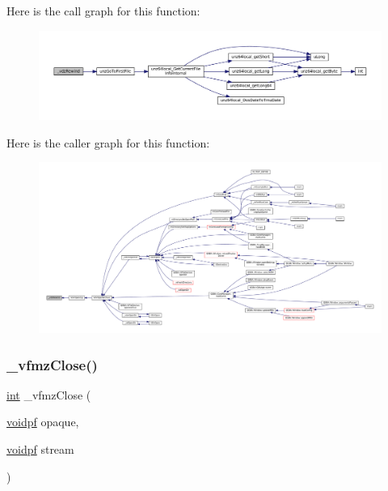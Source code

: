 Here is the call graph for this function\+:
\nopagebreak
\begin{figure}[H]
\begin{center}
\leavevmode
\includegraphics[width=350pt]{vfs-zip_8c_a01992145dbe331dad189be7ade324a00_cgraph}
\end{center}
\end{figure}
Here is the caller graph for this function\+:
\nopagebreak
\begin{figure}[H]
\begin{center}
\leavevmode
\includegraphics[width=350pt]{vfs-zip_8c_a01992145dbe331dad189be7ade324a00_icgraph}
\end{center}
\end{figure}
\mbox{\label{vfs-zip_8c_a31fc3529104f09ba8d094ccef847d08e}} 
\subsubsection{\texorpdfstring{\+\_\+vfmz\+Close()}{\_vfmzClose()}}
{\footnotesize\ttfamily \mbox{\hyperlink{ioapi_8h_a787fa3cf048117ba7123753c1e74fcd6}{int}} \+\_\+vfmz\+Close (\begin{DoxyParamCaption}\item[{\mbox{\hyperlink{ioapi_8h_a39ab6d73c1cd44bc17064c2dcbb3e753}{voidpf}}}]{opaque,  }\item[{\mbox{\hyperlink{ioapi_8h_a39ab6d73c1cd44bc17064c2dcbb3e753}{voidpf}}}]{stream }\end{DoxyParamCaption})}

